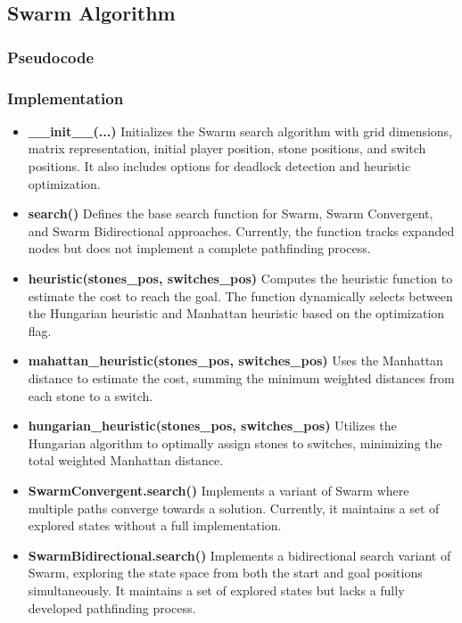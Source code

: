 \subsection{Swarm Algorithm}

\subsubsection{Pseudocode}

\subsubsection{Implementation}
\begin{itemize}
    \item \textbf{\_\_init\_\_(...)}  
    Initializes the Swarm search algorithm with grid dimensions, matrix representation, initial player position, stone positions, and switch positions. It also includes options for deadlock detection and heuristic optimization.

    \item \textbf{search()}  
    Defines the base search function for Swarm, Swarm Convergent, and Swarm Bidirectional approaches. Currently, the function tracks expanded nodes but does not implement a complete pathfinding process.

    \item \textbf{heuristic(stones\_pos, switches\_pos)}  
    Computes the heuristic function to estimate the cost to reach the goal. The function dynamically selects between the Hungarian heuristic and Manhattan heuristic based on the optimization flag.

    \item \textbf{mahattan\_heuristic(stones\_pos, switches\_pos)}  
    Uses the Manhattan distance to estimate the cost, summing the minimum weighted distances from each stone to a switch.

    \item \textbf{hungarian\_heuristic(stones\_pos, switches\_pos)}  
    Utilizes the Hungarian algorithm to optimally assign stones to switches, minimizing the total weighted Manhattan distance.

    \item \textbf{SwarmConvergent.search()}  
    Implements a variant of Swarm where multiple paths converge towards a solution. Currently, it maintains a set of explored states without a full implementation.

    \item \textbf{SwarmBidirectional.search()}  
    Implements a bidirectional search variant of Swarm, exploring the state space from both the start and goal positions simultaneously. It maintains a set of explored states but lacks a fully developed pathfinding process.


\end{itemize}
